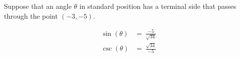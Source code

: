 Suppose that an angle $\theta$ in standard position has a terminal side that passes through the point $(-3, -5)$.

$$
\begin{align*}
  \sin(\theta) &=\ \frac{-5}{\sqrt{34}} \\
  \csc(\theta) &=\ \frac{\sqrt{34}}{-5}
\end{align*}
$$
